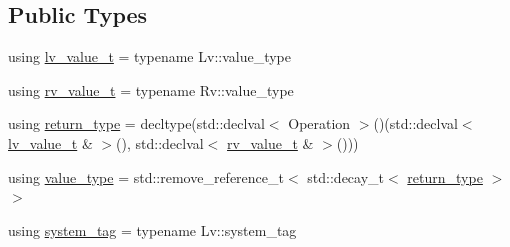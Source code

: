 \subsection*{Public Types}
\begin{DoxyCompactItemize}
\item 
using \hyperlink{structBC_1_1tensors_1_1exprs_1_1Binary__Expression_a8ae3c31b3f8d8ffb55bc6b0fe80bb266}{lv\+\_\+value\+\_\+t} = typename Lv\+::value\+\_\+type
\item 
using \hyperlink{structBC_1_1tensors_1_1exprs_1_1Binary__Expression_ad4a826a303397b65a2e04a8379278fa6}{rv\+\_\+value\+\_\+t} = typename Rv\+::value\+\_\+type
\item 
using \hyperlink{structBC_1_1tensors_1_1exprs_1_1Binary__Expression_a5e8a6e43ec8cbba6a69d209589e02149}{return\+\_\+type} = decltype(std\+::declval$<$ Operation $>$()(std\+::declval$<$ \hyperlink{structBC_1_1tensors_1_1exprs_1_1Binary__Expression_a8ae3c31b3f8d8ffb55bc6b0fe80bb266}{lv\+\_\+value\+\_\+t} \& $>$(), std\+::declval$<$ \hyperlink{structBC_1_1tensors_1_1exprs_1_1Binary__Expression_ad4a826a303397b65a2e04a8379278fa6}{rv\+\_\+value\+\_\+t} \& $>$()))
\item 
using \hyperlink{structBC_1_1tensors_1_1exprs_1_1Binary__Expression_af83a5208b5b457f7cf865b1ca0170260}{value\+\_\+type} = std\+::remove\+\_\+reference\+\_\+t$<$ std\+::decay\+\_\+t$<$ \hyperlink{structBC_1_1tensors_1_1exprs_1_1Binary__Expression_a5e8a6e43ec8cbba6a69d209589e02149}{return\+\_\+type} $>$$>$
\item 
using \hyperlink{structBC_1_1tensors_1_1exprs_1_1Binary__Expression_ab11626c5e785f5ffab80a70d9beaa3e0}{system\+\_\+tag} = typename Lv\+::system\+\_\+tag
\end{DoxyCompactItemize}
